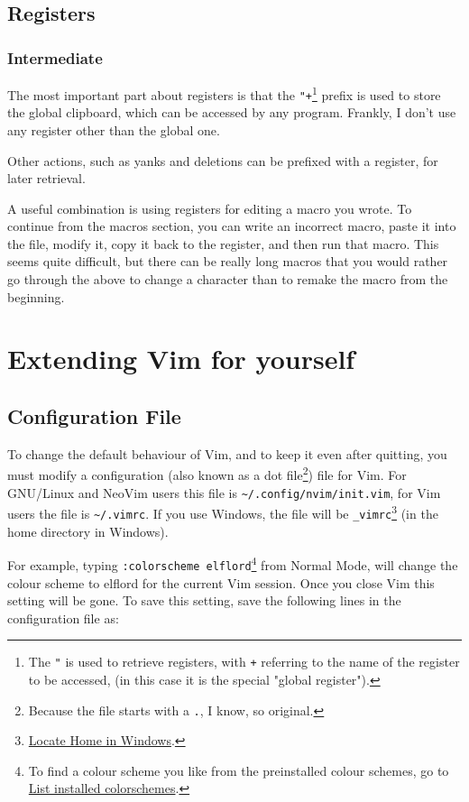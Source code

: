 \documentclass[11pt]{article}
\begin{document}
\subsection{Registers}
\label{sec:orgedd8ad8}
\subsubsection{Intermediate}
\label{sec:org67dd39e}
The most important part about registers is that the \texttt{"+}\footnote{The \texttt{"} is used to retrieve registers, with \texttt{+} referring to 
the name of the register to be accessed, (in this case it is the 
special "global register").} prefix is used
to store the global clipboard, which can be accessed by any program. Frankly, I
don't use any register other than the global one.

Other actions, such as yanks and deletions can be prefixed with a register, for
later retrieval.

A useful combination is using registers for editing a macro you wrote. To
continue from the macros section, you can write an incorrect macro, paste it
into the file, modify it, copy it back to the register, and then run that macro.
This seems quite difficult, but there can be really long macros that you would
rather go through the above to change a character than to remake the macro from
the beginning.
\section{Extending Vim for yourself}
\label{sec:org9be0c70}
\subsection{Configuration File}
\label{sec:org6ff6da5}
To change the default behaviour of Vim, and to keep it even after quitting, you
must modify a configuration (also known as a dot file\footnote{Because the file starts with a \texttt{.}, I know, so original.}) file for Vim. For
GNU/Linux and NeoVim users this file is \texttt{\textasciitilde{}/.config/nvim/init.vim}, for Vim users
the file is \texttt{\textasciitilde{}/.vimrc}. If you use Windows, the file will be \texttt{\_vimrc}\footnote{\href{https://superuser.com/questions/86246/where-should-the-vimrc-file-be-located-on-windows-7}{Locate Home in Windows}.} (in
the home directory in Windows).

For example, typing \texttt{:colorscheme elflord}\footnote{To find a colour scheme you like from the preinstalled colour 
schemes, go to \href{https://stackoverflow.com/questions/7331940/how-to-get-the-list-of-all-installed-color-schemes-in-vim}{List installed colorschemes}.} from Normal Mode, will change
the colour scheme to elflord for the current Vim session. Once you close Vim
this setting will be gone. To save this setting, save the following lines in the
configuration file as:
\end{document}
